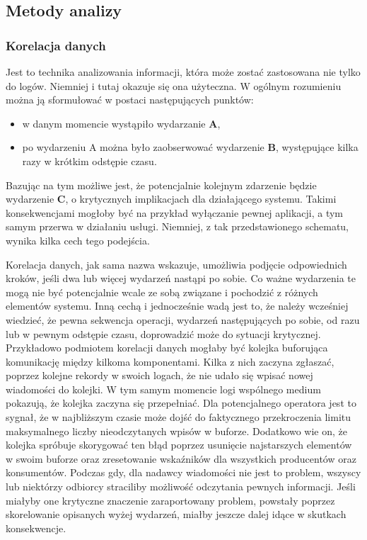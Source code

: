     \subsection{Metody analizy}
    
        \subsubsection{Korelacja danych}
        \label{chapter:logs:analysis:methods:correlation}
        Jest to technika analizowania informacji, która może zostać zastosowana nie tylko do logów. Niemniej
        i tutaj okazuje się ona użyteczna. W ogólnym rozumieniu można ją sformułować w postaci następujących punktów:
        \begin{itemize}
            \item w danym momencie wystąpiło wydarzanie \textbf{A},
            \item po wydarzeniu A można było zaobserwować wydarzenie \textbf{B}, występujące kilka razy w krótkim odstępie czasu.
        \end{itemize}
        Bazując na tym możliwe jest, że potencjalnie kolejnym zdarzenie będzie wydarzenie \textbf{C}, o krytycznych
        implikacjach dla działającego systemu. Takimi konsekwencjami mogłoby być na przykład wyłączanie pewnej 
        aplikacji, a tym samym przerwa w działaniu usługi. Niemniej, z tak przedstawionego schematu, wynika kilka cech
        tego podejścia. 
        
        Korelacja danych, jak sama nazwa wskazuje, umożliwia podjęcie odpowiednich kroków, jeśli dwa lub więcej wydarzeń
        nastąpi po sobie. Co ważne wydarzenia te mogą nie być potencjalnie wcale ze sobą związane i pochodzić z różnych
        elementów systemu. Inną cechą i jednocześnie wadą jest to, że należy wcześniej wiedzieć, że pewna
        sekwencja operacji, wydarzeń następujących po sobie, od razu lub w pewnym odstępie czasu, doprowadzić może
        do sytuacji krytycznej. Przykładowo podmiotem korelacji danych mogłaby być kolejka buforująca 
        komunikację między kilkoma komponentami. Kilka z nich zaczyna zgłaszać, poprzez kolejne rekordy w swoich logach,
        że nie udało się wpisać nowej wiadomości do kolejki. W tym samym momencie logi wspólnego medium pokazują, że
        kolejka zaczyna się przepełniać. Dla potencjalnego operatora jest to sygnał, że w najbliższym czasie może dojść
        do faktycznego przekroczenia limitu maksymalnego liczby nieodczytanych wpisów w buforze. Dodatkowo wie on, że
        kolejka spróbuje skorygować ten błąd poprzez usunięcie najstarszych elementów w swoim buforze oraz zresetowanie
        wskaźników dla wszystkich producentów oraz konsumentów. Podczas gdy, dla nadawcy wiadomości nie jest to problem,
        wszyscy lub niektórzy odbiorcy straciliby możliwość odczytania pewnych informacji. Jeśli miałyby one
        krytyczne znaczenie zaraportowany problem, powstały poprzez skorelowanie opisanych wyżej wydarzeń, miałby jeszcze
        dalej idące w skutkach konsekwencje.
        
